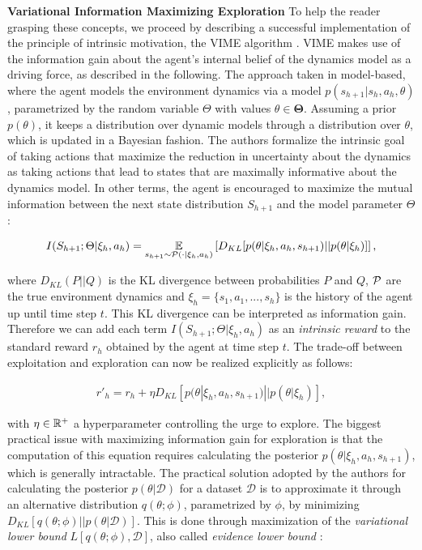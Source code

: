 \textbf{Variational Information Maximizing Exploration}
To help the reader grasping these concepts, we proceed by describing a successful implementation of the principle of intrinsic motivation, the \gls{VIME} algorithm \cite{houthooft2016vime}. \gls{VIME} makes use of the information gain about the agent’s internal belief of the dynamics model as a driving force, as described in the following. The approach taken in model-based, where the agent models the environment dynamics via a model $p(s_{h+1}|s_h,a_h,\theta)$, parametrized by the random variable $\Theta$ with values $\theta\in\boldsymbol{\Theta}$. Assuming a prior $p(\theta)$, it keeps a distribution over dynamic models through a distribution over $\theta$, which is updated in a Bayesian fashion. The authors formalize the intrinsic goal of taking actions that maximize the reduction in uncertainty about the dynamics as taking actions that lead to states that are maximally informative about the dynamics model. In other terms, the agent is encouraged to maximize the mutual information between the next state distribution $S_{h+1}$ and the model parameter $\Theta$:

\begin{align}
I(S_{h+1};\Theta|\xi_h,a_h)=\underset{s_{h+1}\sim\mathcal{P}(\cdot|\xi_h,a_h)}{\mathbb{E}}\left[{D_{KL}[p(\theta|\xi_h,a_h,s_{h+1})||p(\theta|\xi_h)]}\right],
\end{align}

where $D_{KL}(P||Q)$ is the \gls{KL} divergence between probabilities $P$ and $Q$, $\mathcal{P}$ are the true environment dynamics and $\xi_h=\{s_1,a_1,...,s_h\}$ is the history of the agent up until time step $t$. This \gls{KL} divergence can be interpreted as information gain. Therefore we can add each term $I(S_{h+1};\Theta|\xi_h,a_h)$ as an \emph{intrinsic reward} to the standard reward $r_h$ obtained by the agent at time step $t$. The trade-off between exploitation and
exploration can now be realized explicitly as follows:

\begin{align}
r'_h = r_h + \eta D_{KL}[p(\theta|\xi_h,a_h,s_{h+1})||p(\theta|\xi_h)], \label{eq:augmentedreward}
\end{align}
 
with $\eta\in\mathbb{R}^+$ a hyperparameter controlling the urge to explore. The biggest practical
issue with maximizing information gain for exploration is that the computation of this equation requires calculating the posterior $p(\theta|\xi_h,a_h,s_{h+1})$, which is generally intractable. The practical solution adopted by the authors for calculating the posterior $p(\theta|\mathcal{D})$ for a dataset $\mathcal{D}$ is to approximate it through an alternative distribution $q(\theta;\phi)$, parametrized by $\phi$, by minimizing $D_{KL}[q(\theta;\phi)||p(\theta|\mathcal{D})]$. This is done through maximization of the \emph{variational lower bound} $L[q(\theta;\phi),\mathcal{D}]$, also called \emph{evidence lower bound} \cite{blei2017variational}:

